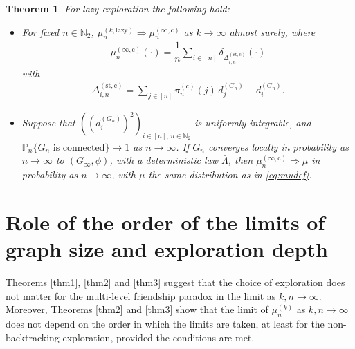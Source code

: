 \documentclass[11pt]{article}
\numberwithin{equation}{section}
\theoremstyle{plain}
\newtheorem{theorem}{Theorem}[section]
\newcommand{\N}{\mathbb N}
\newcommand{\weak}{\Longrightarrow}
\renewcommand{\P}{\mathbb P}
\newcommand{\dn}{d^{(G_{n})}}
\begin{document}
\begin{theorem}
\label{thm6}
For lazy exploration the following hold:
\begin{itemize}
\item[{\rm (a)}] 
For fixed $n\in\N_{2}$, $\mu_{n}^{(k,\mathrm{lazy})} \weak \mu_{n}^{(\infty ,\mathrm{c})}$ as $k\to\infty$ almost surely, where 
\begin{align*}
\mu_{n}^{(\infty ,\mathrm{c})}(\cdot)= \dfrac{1}{n}\sum_{i \in [n]} \delta_{\Delta^{(\mathrm{st},\mathrm{c})}_{i,n}}(\cdot)
\end{align*}
with
\begin{align*}
\Delta^{(\mathrm{st},\mathrm{c})}_{i,n}= \sum_{j\in [n]}\pi_{n}^{(\mathrm{c})}(j)\,\dn_{j}-\dn_{i}.
\end{align*}
\item[{\rm (b)}]
Suppose that $((\dn_{i})^{2})_{i\in [n],\,n\in\N_{2}}$ is uniformly integrable, and $\P_{n}\{G_{n}\text{ is connected}\} \to 1$ as $n\to\infty$. If $G_n$ converges locally in probability as $n\to\infty$ to $(G_{\infty},\phi)$, with a deterministic law $\bar{\Lambda}$, then $\mu_n^{(\infty ,\mathrm{c})} \weak \mu$ in probability as $n\to\infty$, with $\mu$ the same distribution as in \eqref{eq:mudef}.
\end{itemize}
\end{theorem}




\section{Role of the order of the limits of graph size and exploration depth}
\label{sec:orderoflimits}

Theorems \ref{thm1}, \ref{thm2} and \ref{thm3} suggest that the choice of exploration does not matter for the multi-level friendship paradox in the limit as $k,n\to\infty$. Moreover, Theorems \ref{thm2} and \ref{thm3} show that the limit of $\mu_{n}^{(k)}$ as $k,n \to \infty$ does not depend on the order in which the limits are taken, at least for the non-backtracking exploration, provided the conditions are met. 
\end{document}
